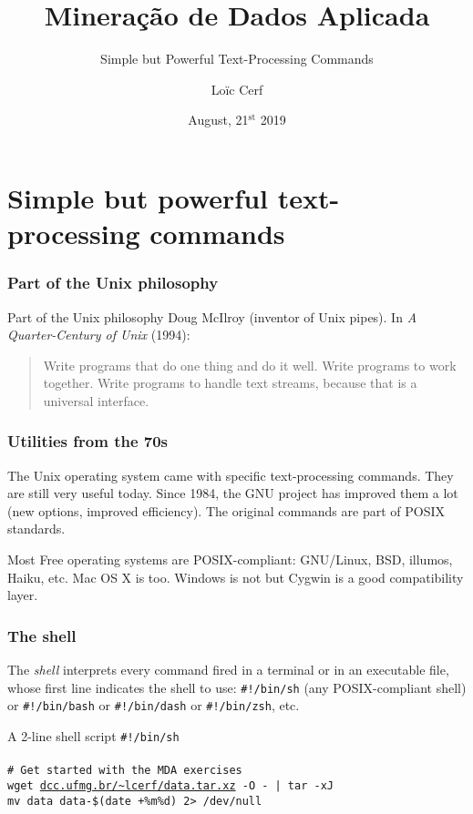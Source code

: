 \documentclass{beamer}
\title{Mineração de Dados Aplicada}
\subtitle{Simple but Powerful Text-Processing Commands}
\author{Loïc Cerf}
\date{August, 21$^{\text{st}}$ 2019}
\institute
{
  \scriptsize
  DCC -- ICEx -- UFMG
  \bigskip\\
  \texttt{[image: images/dcc]}\hfill\texttt{[image: images/ufmg]}
}
\begin{document}
\begin{frame}[plain]
  \titlepage
\end{frame}

\section*{Simple but powerful text-processing commands}

\begin{frame}
  \frametitle{Part of the Unix philosophy}
  \begin{block}{Part of the Unix philosophy}
    Doug McIlroy (inventor of Unix pipes). In \emph{A Quarter-Century
      of Unix} (1994):\\
    \begin{quotation}
      Write programs that do one thing and do it well. Write programs
      to work together. Write programs to handle text streams, because
      that is a universal interface.
    \end{quotation}
  \end{block}
\end{frame}

\begin{frame}
  \frametitle{Utilities from the 70s}
  The Unix operating system came with specific text-processing
  commands.  They are still very useful today. Since 1984, the GNU
  project has improved them a lot (new options, improved
  efficiency). The original commands are part of POSIX standards.

  \vfill
  \pause

  Most Free operating systems are POSIX-compliant: GNU/Linux, BSD,
  illumos, Haiku, etc. Mac OS X is too. Windows is not but Cygwin is a
  good compatibility layer.
\end{frame}

\begin{frame}
  \frametitle{The shell}
  The \emph{shell} interprets every command fired in a terminal or in
  an executable file, whose first line indicates the shell to use:
  \texttt{\#!/bin/sh} (any POSIX-compliant shell) or
  \texttt{\#!/bin/bash} or \texttt{\#!/bin/dash} or
  \texttt{\#!/bin/zsh}, etc.

  \vfill

  \begin{exampleblock}{A 2-line shell script}
    \texttt{\#!/bin/sh}\\
    ~\\
    \texttt{\# Get started with the MDA exercises}\\
    \texttt{wget \url{dcc.ufmg.br/~lcerf/data.tar.xz} -O - | tar -xJ}\\
    \texttt{mv data data-\$(date +\%m\%d) 2> /dev/null}
  \end{exampleblock}
\end{frame}
\end{document}
